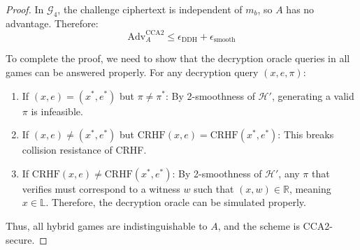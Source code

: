 \begin{proof}
In $\mathcal{G}_4$, the challenge ciphertext is independent of $m_b$, so $A$ has no advantage. Therefore:
\[ \text{Adv}^{\text{CCA2}}_A \leq \epsilon_{\text{DDH}} + \epsilon_{\text{smooth}} \]

To complete the proof, we need to show that the decryption oracle queries in all games can be answered properly. For any decryption query $(x,e,\pi)$:

\begin{enumerate}
    \item If $(x,e) = (x^*,e^*)$ but $\pi \neq \pi^*$: By 2-smoothness of $\mathcal{H}'$, generating a valid $\pi$ is infeasible.
    \item If $(x,e) \neq (x^*,e^*)$ but $\text{CRHF}(x,e) = \text{CRHF}(x^*,e^*)$: This breaks collision resistance of CRHF.
    \item If $\text{CRHF}(x,e) \neq \text{CRHF}(x^*,e^*)$: By 2-smoothness of $\mathcal{H}'$, any $\pi$ that verifies must correspond to a witness $w$ such that $(x,w) \in \mathbb{R}$, meaning $x \in \mathbb{L}$. Therefore, the decryption oracle can be simulated properly.
\end{enumerate}

Thus, all hybrid games are indistinguishable to $A$, and the scheme is CCA2-secure.
\end{proof}


